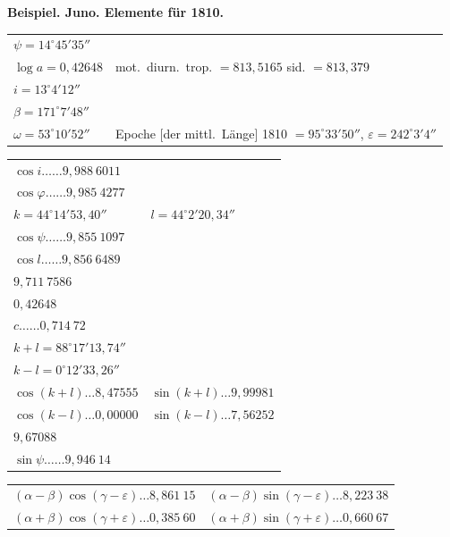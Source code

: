 \documentclass[12pt,a4paper]{article}
\begin{document}
\newpage

\textbf{Beispiel. Juno. Elemente f\"ur 1810.}

\begin{center}
\begin{tabular}{ll}
$\psi = 14^\circ 45' 35''$ & \\
$\log a = 0{,}42648$ & mot.~diurn.~trop. $= 813{,}5165$ \quad sid. $= 813{,}379$ \\
$i = 13^\circ 4' 12''$ & \\
$\beta = 171^\circ 7' 48''$ & \\
$\omega = 53^\circ 10' 52''$ & Epoche [der mittl.~L\"ange] 1810 $= 95^\circ 33' 50''$, \quad $\varepsilon = 242^\circ 3' 4''$
\end{tabular}
\end{center}

\begin{center}
\begin{tabular}{ll}
$\cos i \ldots\ldots 9{,}988\ 6011$ & \\
$\cos\varphi \ldots\ldots 9{,}985\ 4277$ & \\
$k = 44^\circ 14' 53{,}40''$ & $l = 44^\circ 2' 20{,}34''$ \\
$\cos\psi \ldots\ldots 9{,}855\ 1097$ & \\
$\cos l \ldots\ldots 9{,}856\ 6489$ & \\
\multicolumn{2}{l}{$9{,}711\ 7586$} \\
$0{,}42648$ & \\
$c \ldots\ldots 0{,}714\ 72$ & \\
$k + l = 88^\circ 17' 13{,}74''$ & \\
$k - l = 0^\circ 12' 33{,}26''$ & \\
$\cos(k + l) \ldots 8{,}47555$ & $\sin(k + l) \ldots 9{,}99981$ \\
$\cos(k - l) \ldots 0{,}00000$ & $\sin(k - l) \ldots 7{,}56252$ \\
\multicolumn{2}{l}{$9{,}67088$} \\
$\sin\psi \ldots\ldots 9{,}946\ 14$ & \\
\end{tabular}
\end{center}

\begin{center}
\begin{tabular}{ll}
$(\alpha - \beta)\cos(\gamma - \varepsilon) \ldots 8{,}861\ 15$ & $(\alpha - \beta)\sin(\gamma - \varepsilon) \ldots 8{,}223\ 38$ \\
$(\alpha + \beta)\cos(\gamma + \varepsilon) \ldots 0{,}385\ 60$ & $(\alpha + \beta)\sin(\gamma + \varepsilon) \ldots 0{,}660\ 67$
\end{tabular}
\end{center}
\end{document}
